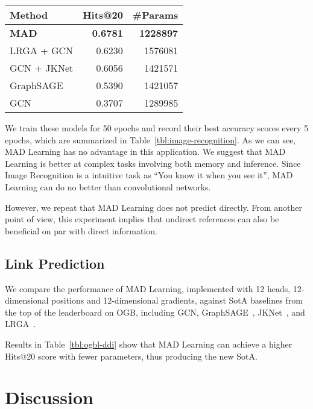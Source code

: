 \documentclass{article}
\begin{document}
\begin{table*}\centering
\begin{tabular}{lrr}
\toprule
 Method & Hits@20 & \#Params\\
\midrule
\textbf{MAD} & \textbf{0.6781} & \textbf{1228897}\\
LRGA + GCN   & 0.6230          & 1576081\\
GCN + JKNet  & 0.6056          & 1421571\\
GraphSAGE    & 0.5390          & 1421057\\
GCN          & 0.3707          & 1289985\\
\bottomrule
\end{tabular}
\caption{Link Prediction on ogbl-ddi}
\label{tbl:ogbl-ddi}
\end{table*}

We train these models for 50 epochs and record their best accuracy
scores every 5 epochs, which are summarized in
Table~\ref{tbl:image-recognition}. As we
can see, MAD Learning has no advantage in this application.
We suggest that MAD Learning
is better at complex tasks involving both memory and inference.
Since Image Recognition is a intuitive task as ``You know it
when you see it'', MAD Learning can do no better than convolutional
networks.

However, we repeat that MAD Learning does not predict directly.
From another point of view, this experiment implies that undirect
references can also be beneficial on par with direct information.

\hypertarget{link-prediction-1}{\subsection{Link Prediction}\label{ssec:link-prediction}}



We compare the performance of MAD Learning, implemented
with 12 heads, 12-dimensional positions and 12-dimensional gradients,
against SotA baselines from the top of the leaderboard on OGB, including GCN,
GraphSAGE~\cite{hamilton2017inductive}, JKNet~\cite{xu2018representation},
and LRGA~\cite{2006.07846v1}.

Results in Table~\ref{tbl:ogbl-ddi} show that MAD Learning can achieve a
higher Hits@20 score with fewer parameters, thus producing the new SotA.

\hypertarget{discussion}{\section{Discussion}\label{sec:discussion}}
\end{document}
